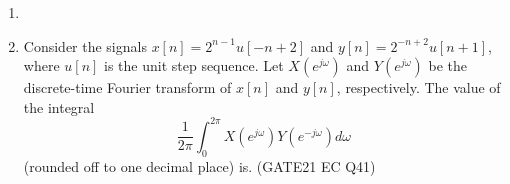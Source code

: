 \begin{enumerate}[label=\thechapter.\arabic*,ref=\thechapter.\theenumi]
\item 
\solution

\pagebreak

\item Consider the signals \(x[n] = 2^{n-1} u[-n+2]\) and \(y[n] = 2^{-n+2} u[n+1]\), where \(u[n]\) is the unit step sequence. Let \(X(e^{j\omega})\) and \(Y(e^{j\omega})\) be the discrete-time Fourier transform of \(x[n]\) and \(y[n]\), respectively. The value of the integral
\[
\frac{1}{2\pi} \int_{0}^{2\pi} X(e^{j\omega}) Y(e^{-j\omega}) d\omega
\]
(rounded off to one decimal place) is.
\hfill(GATE21 EC Q41)\\
\solution

\pagebreak
\end{enumerate}
